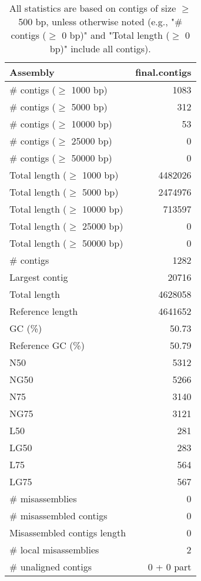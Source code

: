 \documentclass[12pt,a4paper]{article}
\begin{document}
\begin{table}[ht]
\begin{center}
\caption{All statistics are based on contigs of size $\geq$ 500 bp, unless otherwise noted (e.g., "\# contigs ($\geq$ 0 bp)" and "Total length ($\geq$ 0 bp)" include all contigs).}
\begin{tabular}{|l*{1}{|r}|}
\hline
Assembly & final.contigs \\ \hline
\# contigs ($\geq$ 1000 bp) & 1083 \\ \hline
\# contigs ($\geq$ 5000 bp) & 312 \\ \hline
\# contigs ($\geq$ 10000 bp) & 53 \\ \hline
\# contigs ($\geq$ 25000 bp) & 0 \\ \hline
\# contigs ($\geq$ 50000 bp) & 0 \\ \hline
Total length ($\geq$ 1000 bp) & 4482026 \\ \hline
Total length ($\geq$ 5000 bp) & 2474976 \\ \hline
Total length ($\geq$ 10000 bp) & 713597 \\ \hline
Total length ($\geq$ 25000 bp) & 0 \\ \hline
Total length ($\geq$ 50000 bp) & 0 \\ \hline
\# contigs & 1282 \\ \hline
Largest contig & 20716 \\ \hline
Total length & 4628058 \\ \hline
Reference length & 4641652 \\ \hline
GC (\%) & 50.73 \\ \hline
Reference GC (\%) & 50.79 \\ \hline
N50 & 5312 \\ \hline
NG50 & 5266 \\ \hline
N75 & 3140 \\ \hline
NG75 & 3121 \\ \hline
L50 & 281 \\ \hline
LG50 & 283 \\ \hline
L75 & 564 \\ \hline
LG75 & 567 \\ \hline
\# misassemblies & 0 \\ \hline
\# misassembled contigs & 0 \\ \hline
Misassembled contigs length & 0 \\ \hline
\# local misassemblies & 2 \\ \hline
\# unaligned contigs & 0 + 0 part \\ \hline

\end{tabular}
\end{center}
\end{table}
\end{document}
